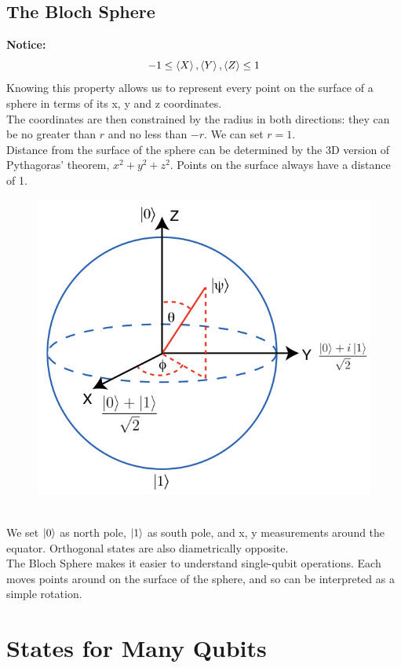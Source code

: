 \documentclass[hidelinks, a4paper, 12pt]{article}
\newcommand{\bd}{\textbf}
\newcommand{\n}{\\[\baselineskip]}
\begin{document}
        \subsection{The Bloch Sphere}
            \bd{Notice:}
            \[-1 \leq \braket{X}, \braket{Y}, \braket{Z} \leq 1\]
            Knowing this property allows us to represent every point on the surface of a sphere in terms of its x, y and z coordinates.\n
            The coordinates are then constrained by the radius in both directions: they can be no greater than $r$ and no less than $-r$. We can set $r = 1$.\n
            Distance from the surface of the sphere can be determined by the 3D version of Pythagoras' theorem, $x^2 + y^2 + z^2$. 
            Points on the surface always have a distance of 1.\n
            \begin{figure}[ht]
                \centering
                \includegraphics[scale=0.4]{bloch-sphere}
            \end{figure}\n
            We set $\ket{0}$ as north pole, $\ket{1}$ as south pole, and x, y measurements around the equator. Orthogonal states are also diametrically opposite.\n
            The Bloch Sphere makes it easier to understand single-qubit operations. Each moves points around on the surface of the sphere, and so can be interpreted as a simple rotation.

    \section{States for Many Qubits}
\end{document}
